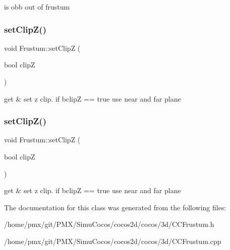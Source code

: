is obb out of frustum \mbox{\label{classFrustum_aeaee893e649086140744a814e62f5701}} 
\subsubsection{\texorpdfstring{set\+Clip\+Z()}{setClipZ()}\hspace{0.1cm}{\footnotesize\ttfamily [1/2]}}
{\footnotesize\ttfamily void Frustum\+::set\+ClipZ (\begin{DoxyParamCaption}\item[{bool}]{clipZ }\end{DoxyParamCaption})\hspace{0.3cm}{\ttfamily [inline]}}

get \& set z clip. if bclipZ == true use near and far plane \mbox{\label{classFrustum_aeaee893e649086140744a814e62f5701}} 
\subsubsection{\texorpdfstring{set\+Clip\+Z()}{setClipZ()}\hspace{0.1cm}{\footnotesize\ttfamily [2/2]}}
{\footnotesize\ttfamily void Frustum\+::set\+ClipZ (\begin{DoxyParamCaption}\item[{bool}]{clipZ }\end{DoxyParamCaption})\hspace{0.3cm}{\ttfamily [inline]}}

get \& set z clip. if bclipZ == true use near and far plane 

The documentation for this class was generated from the following files\+:\begin{DoxyCompactItemize}
\item 
/home/pmx/git/\+P\+M\+X/\+Simu\+Cocos/cocos2d/cocos/3d/C\+C\+Frustum.\+h\item 
/home/pmx/git/\+P\+M\+X/\+Simu\+Cocos/cocos2d/cocos/3d/C\+C\+Frustum.\+cpp\end{DoxyCompactItemize}
